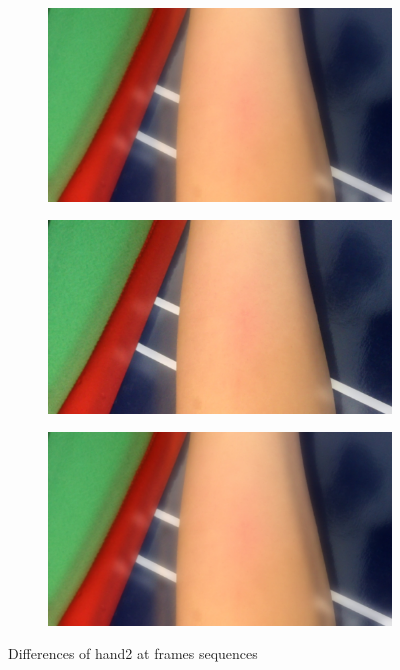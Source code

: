 \begin{figure}[!h]
\begin{subfigure}{.3\textwidth}
  \label{fig:sub2}
\end{subfigure}
\begin{subfigure}{.3\textwidth}
  \centering
  \includegraphics[scale=0.08]{img/eulerian/test/handc4}
  \label{fig:sub2}
\end{subfigure}%
\begin{subfigure}{.3\textwidth}
  \centering
  \includegraphics[scale=0.08]{img/eulerian/test/handc5}
  \label{fig:sub2}
\end{subfigure}
\begin{subfigure}{.3\textwidth}
  \centering
  \includegraphics[scale=0.08]{img/eulerian/test/handc6}
  \label{fig:sub2}
\end{subfigure}
\caption{Differences of hand2 at frames sequences}
\label{fig:test}
\end{figure}


